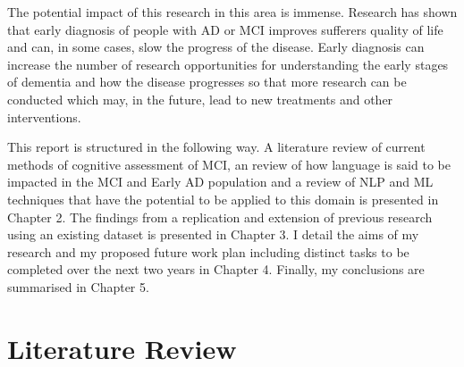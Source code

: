 \documentclass[10pt, letterpaper, twoside, openany]{book}
\begin{document}
\par
The potential impact of this research in this area is immense. Research has shown that early diagnosis of people with AD or MCI improves sufferers quality of life and can, in some cases, slow the progress of the disease. Early diagnosis can increase the number of research opportunities for understanding the early stages of dementia and how the disease progresses so that more research can be conducted which may, in the future, lead to new treatments and other interventions.
\par
This report is structured in the following way. A literature review of current methods of cognitive assessment of MCI, an review of how language is said to be impacted in the MCI and Early AD population and a review of NLP and ML techniques that have the potential to be applied to this domain is presented in Chapter 2. The findings from a replication and extension of previous research using an existing dataset is presented in Chapter 3. I detail the aims of my research and my proposed future work plan including distinct tasks to be completed over the next two years in Chapter 4. Finally, my conclusions are summarised in Chapter 5.  

\chapter{Literature Review}
\end{document}
